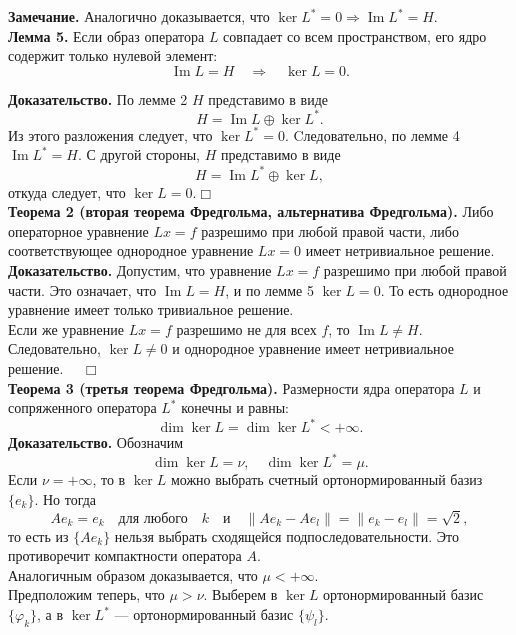 \documentclass[12pt,a4paper, titlepage]{article}
\renewcommand{\Im}{\mathop{\mathrm{Im}}\nolimits}
\begin{document}
\textbf{Замечание.} Аналогично доказывается, что $\ker L^* = 0 \Rightarrow \Im L^* = H$.\\

\textbf{Лемма 5.} Если образ оператора $L$ совпадает со всем пространством, его ядро содержит только нулевой элемент:
$$
\Im L = H \quad \Rightarrow \quad \ker L = 0.
$$

\textbf{Доказательство.} По лемме 2 $H$ представимо в виде
$$
H = \Im L \oplus \ker L^*.
$$
Из этого разложения следует, что $\ker L^* = 0$. Cледовательно, по лемме 4 $\Im L^* = H$. С другой стороны, $H$ представимо в виде
$$
H = \Im L^* \oplus \ker L,
$$
откуда следует, что $\ker L = 0$.$\Box$\\

\textbf{Теорема 2 (вторая теорема Фредгольма, альтернатива Фредгольма).} Либо операторное уравнение $Lx = f$ разрешимо при любой правой части, либо соответствующее однородное уравнение $Lx = 0$ имеет нетривиальное решение.\\
\textbf{Доказательство.} Допустим, что уравнение $Lx = f$ разрешимо при любой правой части. Это означает, что $\Im L = H$, и по лемме 5 $\ker L = 0$. То есть однородное уравнение имеет только тривиальное решение.\\

Если же уравнение $Lx = f$ разрешимо не для всех $f$, то $\Im L \neq H$. Следовательно, $\ker L \neq 0$ и однородное уравнение имеет нетривиальное решение. $\quad\Box$\\

\textbf{Теорема 3 (третья теорема Фредгольма).} Размерности ядра оператора $L$ и сопряженного оператора $L^*$ конечны и равны:
$$
\dim \ker L = \dim \ker L^* < +\infty.
$$
\textbf{Доказательство.} Обозначим
$$
\dim \ker L = \nu, \quad \dim \ker L^* = \mu.
$$
Если $\nu = +\infty$, то в $\ker L$ можно выбрать счетный ортонормированный базиз $\{e_k\}$. Но тогда
$$
Ae_k = e_k \quad \text{для любого} \quad k \quad \text{и} \quad \|Ae_k - Ae_l\| = \|e_k - e_l\| = \sqrt{2},
$$
то есть из $\{Ae_k\}$ нельзя выбрать сходящейся подпоследовательности. Это противоречит компактности оператора $A$.\\

Аналогичным образом доказывается, что $\mu < +\infty$.\\

Предположим теперь, что $\mu > \nu$. Выберем в $\ker L$ ортонормированный базис $\{{\varphi}_k\}$, а в $\ker L^*$ --- ортонормированный базис $\{\psi_l\}$.\\
\end{document}
